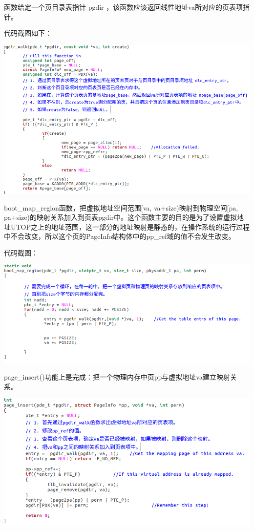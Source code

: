 \begin{ExerciseList}


  函数给定一个页目录表指针 pgdir ，该函数应该返回线性地址va所对应的页表项指针。

  代码截图如下：


  \includegraphics[width=6in]{figures/lab2/image45.png}


  boot\_map\_region函数，把虚拟地址空间范围[va, va+size)映射到物理空间[pa, pa+size)的映射关系加入到页表pgdir中。这个函数主要的目的是为了设置虚拟地址UTOP之上的地址范围，这一部分的地址映射是静态的，在操作系统的运行过程中不会改变，所以这个页的PageInfo结构体中的pp\_ref域的值不会发生改变。


      代码截图：


      \includegraphics[width=6in]{figures/lab2/image46.png}


      page\_insert()功能上是完成：把一个物理内存中页pp与虚拟地址va建立映射关系。


      \includegraphics[width=6in]{figures/lab2/image47.png}


\end{ExerciseList}
